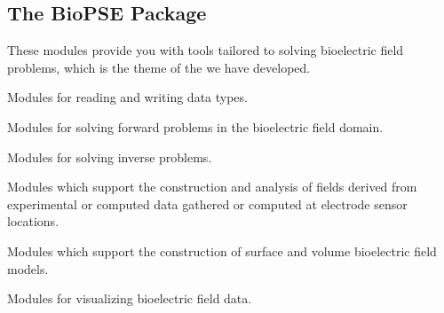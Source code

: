 \subsection{The BioPSE Package}
\label{sec:biopsepackage}


These modules provide you with tools tailored to solving bioelectric field
problems, which is the theme of the  we have developed.


\begin{description}
   Modules for reading and writing \sr{}
  data types.
  
   Modules for solving forward
  problems in the bioelectric field domain.
  
   Modules for solving inverse
  problems.
  
   Modules which support
  the construction and analysis of fields derived from experimental or
  computed data gathered or computed at electrode sensor locations.
  
   Modules which support the
  construction of surface and volume bioelectric field models.
  
   Modules for visualizing
  bioelectric field data.
\end{description}

